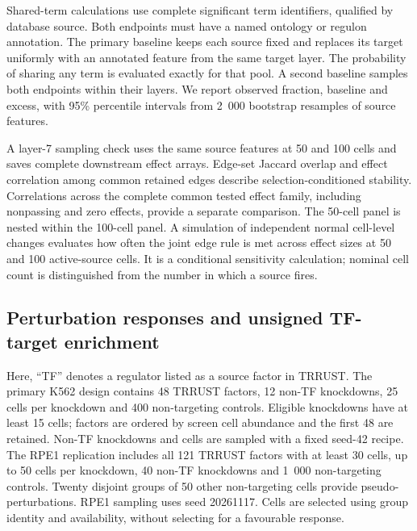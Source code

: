\documentclass[review,authoryear,12pt]{elsarticle}
\begin{document}
Shared-term calculations use complete significant term identifiers, qualified by database source.
Both endpoints must have a named ontology or regulon annotation. The primary baseline keeps each
source fixed and replaces its target uniformly with an annotated feature from the same target
layer. The probability of sharing any term is evaluated exactly for that pool. A second baseline
samples both endpoints within their layers. We report observed fraction, baseline and excess,
with 95\% percentile intervals from 2~000 bootstrap resamples of source features.

A layer-7 sampling check uses the same source features at 50 and 100 cells and saves complete
downstream effect arrays. Edge-set Jaccard overlap and effect correlation among common retained
edges describe selection-conditioned stability. Correlations across the complete common tested
effect family, including nonpassing and zero effects, provide a separate comparison. The 50-cell
panel is nested within the 100-cell panel. A simulation of independent normal cell-level changes evaluates how often
the joint edge rule is met across effect sizes at 50 and 100 active-source cells. It is a conditional
sensitivity calculation; nominal cell count is distinguished from the number in which a source fires.

\subsection{Perturbation responses and unsigned TF-target enrichment}

Here, ``TF'' denotes a regulator listed as a source factor in TRRUST.
The primary K562 design contains 48 TRRUST factors, 12 non-TF knockdowns, 25 cells per knockdown and
400 non-targeting controls. Eligible knockdowns have at least 15 cells; factors are ordered by
screen cell abundance and the first 48 are retained. Non-TF knockdowns and cells are sampled with
a fixed seed-42 recipe. The RPE1 replication
includes all 121 TRRUST factors with at least 30 cells, up to 50 cells per knockdown, 40 non-TF
knockdowns and 1~000 non-targeting controls. Twenty disjoint groups of 50 other non-targeting cells
provide pseudo-perturbations. RPE1 sampling uses seed 20261117. Cells are selected using group
identity and availability, without selecting for a favourable response.
\end{document}
